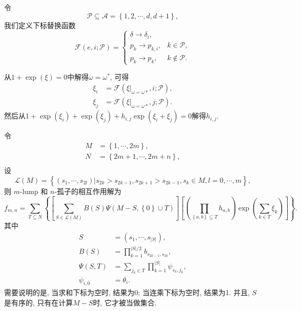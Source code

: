 \documentclass{article}
\newcommand{\sbrace}[1]{\left(#1\right)}
\newcommand{\mbrace}[1]{\left[#1\right]}
\newcommand{\bbrace}[1]{\left\{#1\right\}}
\newcommand{\eval}[2]{\left.{#1}\right|_{#2}}
\newcommand{\ALLP}{\mathcal{A}}
\newcommand{\PS}{\mathcal{P}}
\begin{document}
令
\begin{equation}
\PS\subseteq \ALLP=\bbrace{1,2,\cdots,d,d+1} ,
\end{equation}
我们定义下标替换函数
\begin{equation}
\mathcal F\sbrace{e,i;\PS}=\left\{\begin{array}{ll}
  \delta \to \delta_i, &  \\ 
  p_k \to p_{k,i}, & k \in \PS ,\\ 
  p_k \to p_k , & k \not\in\PS .
\end{array}\right.
\end{equation}

从$1+\exp(\xi)=0$中解得$\omega=\omega^*$, 可得 
\begin{equation}
\begin{aligned}
  \xi_i&=\mathcal{F}\sbrace{\eval{\xi}{\omega=\omega*},i;\PS} ,\\
  \xi_j&=\mathcal{F}\sbrace{\eval{\xi}{\omega=\omega*},j;\PS} .
\end{aligned}
\end{equation}
然后从$1+\exp(\xi_i)+\exp(\xi_j)+h_{i,j}\exp(\xi_i+\xi_j)=0$解得$h_{i,j}$. 

令
\begin{equation}
\begin{aligned}
M&=\bbrace{1,\cdots,2m}, \\ 
N&=\bbrace{2m+1,\cdots,2m+n}, \\ 
\end{aligned}
\end{equation}
设
\begin{equation}
\mathcal{L}(M)=\bbrace{\sbrace{s_1,\cdots,s_{2l}}|s_{2k}>s_{2k-1},s_{2k+1}>s_{2k-1},s_k\in M,l=0,\cdots,m} , 
\end{equation}
则 $m$-lump 和 $n$-孤子的相互作用解为
\begin{equation}
f_{m,n}=\sum_{T\subseteq N}\bbrace{
  \mbrace{
    \sum_{S\in \mathcal{L}(M)}{
      B(S)
      \Psi\sbrace{M-S,\bbrace{0}\cup T}
    }
  }
  \mbrace{
    \sbrace{\prod_{\bbrace{a,b}\subseteq T}{h_{a,b}}}
    \exp\sbrace{\sum_{k\in T}{\xi_k}}
  }
}. 
\end{equation}
其中 
\begin{equation}
\begin{aligned}
S&=\sbrace{s_1,\cdots,s_{|S|}}, \\ 
B(S)&=\prod_{k=1}^{|S|/2}{b_{s_{2k-1},s_{2k}}},\\ 
\Psi(S,T)&=\sum_{j_k\in T}{\prod_{k=1}^{|S|}{\psi_{s_k,j_k}}}, \\ 
\psi_{i,0}&=\theta_i . 
\end{aligned}
\end{equation}
需要说明的是, 当求和下标为空时, 结果为0; 当连乘下标为空时, 结果为1. 并且, $S$是有序的, 只有在计算$M-S$时, 它才被当做集合. 
\end{document}
